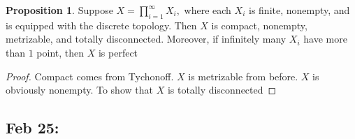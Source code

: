 \documentclass[10pt, oneside]{article}
\theoremstyle{definition}
\newtheorem{prop}{Proposition}
\begin{document}
\begin{prop}
    Suppose $X = \displaystyle\prod_{i=1}^\infty X_i,$ where each $X_i$ is finite, nonempty, and is equipped with the discrete topology. Then $X$ is compact, nonempty, metrizable, and totally disconnected. Moreover, if infinitely many $X_i$ have more than $1$ point, then $X$ is perfect
\end{prop}
\begin{proof}
    Compact comes from Tychonoff. $X$ is metrizable from before. $X$ is obviously nonempty. To show that $X$ is totally disconnected
    
\end{proof}

\newpage
\subsection*{Feb 25: }
\end{document}
